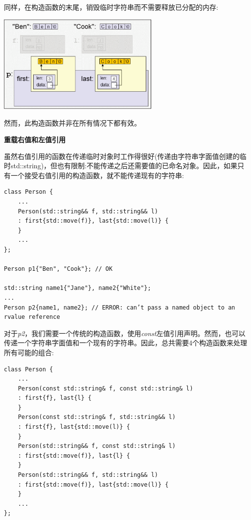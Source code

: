 同样，在构造函数的末尾，销毁临时字符串而不需要释放已分配的内存:\par

\begin{center}
	\includegraphics[width=0.6\textwidth]{content/1/chapter4/images/11}
\end{center}

然而，此构造函数并非在所有情况下都有效。\par

\hspace*{\fill} \par %
\textbf{重载右值和左值引用}

虽然右值引用的函数在传递临时对象时工作得很好(传递由字符串字面值创建的临时std::string)，但也有限制:不能传递之后还需要值的已命名对象。因此，如果只有一个接受右值引用的构造函数，就不能传递现有的字符串:\par

\begin{lstlisting}[caption={}]
class Person {
	...
	Person(std::string&& f, std::string&& l)
	: first{std::move(f)}, last{std::move(l)} {
	}
	...
};

Person p1{"Ben", "Cook"}; // OK

std::string name1{"Jane"}, name2{"White"};
...
Person p2{name1, name2}; // ERROR: can’t pass a named object to an rvalue reference
\end{lstlisting}

对于\textit{p2}，我们需要一个传统的构造函数，使用\textit{const}左值引用声明。然而，也可以传递一个字符串字面值和一个现有的字符串。因此，总共需要4个构造函数来处理所有可能的组合:\par

\begin{lstlisting}[caption={}]
class Person {
	...
	Person(const std::string& f, const std::string& l)
	: first{f}, last{l} {
	}
	Person(const std::string& f, std::string&& l)
	: first{f}, last{std::move(l)} {
	}
	Person(std::string&& f, const std::string& l)
	: first{std::move(f)}, last{l} {
	}
	Person(std::string&& f, std::string&& l)
	: first{std::move(f)}, last{std::move(l)} {
	}
	...
};
\end{lstlisting}

